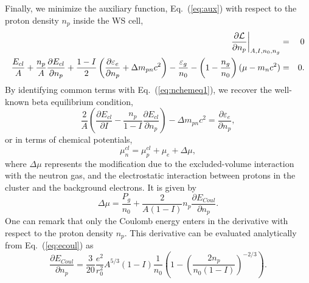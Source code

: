 Finally, we minimize the auxiliary function, Eq.~(\ref{eq:aux}) with respect to
the proton density $n_p$ inside the WS cell,
%
\begin{eqnarray}
  \frac{\partial \mathcal{L}}{\partial n_p}\bigg|_{A,I,n_0,n_g} &=& 0 \notag\\
  \frac{E_{cl}}{A} + \frac{n_p}{A}\frac{\partial E_{cl}}{\partial n_p} +
  \frac{1-I}{2}\left(\frac{\partial \varepsilon_e}{\partial n_p} + \Delta
  m_{pn}c^2\right) - \frac{\varepsilon_g}{n_0} -
  \left(1-\frac{n_g}{n_0}\right)(\mu-m_nc^2) &=& 0. \notag\\
\end{eqnarray}
%
By identifying common terms with Eq.~(\ref{eq:nchemeq1}), we recover the 
well-known beta equilibrium condition,
%
\begin{equation}
  \frac{2}{A}\left(\frac{\partial E_{cl}}{\partial I} -
  \frac{n_p}{1-I}\frac{\partial E_{cl}}{\partial n_p}\right) - \Delta
  m_{pn}c^2 =
  \frac{\partial \varepsilon_e}{\partial n_p},
\end{equation}
%
or in terms of chemical potentials,
%
\begin{equation}
  \mu_n^{cl} = \mu_p^{cl} + \mu_e + \Delta \mu,\label{eq:betaeq}
\end{equation}
%
where $\Delta \mu$ represents the modification due to the excluded-volume
interaction with the neutron gas, and the electrostatic interaction between
protons in the cluster and the background electrons. It is given by
%
\begin{equation}
  \Delta \mu = \frac{P_g}{n_0} + \frac{2}{A(1-I)}n_p\frac{\partial
  E_{Coul}}{\partial n_p}.
\end{equation}
%
One can remark that only the Coulomb energy enters in the derivative with
respect to the proton density $n_p$. This derivative can be evaluated
analytically from Eq.~(\ref{eq:ecoul}) as
%
\begin{equation}
  \frac{\partial E_{Coul}}{\partial n_p} =
  \frac{3}{20}\frac{e^2}{r_0^2}A^{5/3}(1-I)\frac{1}{n_0}
  \left(1-\left(\frac{2n_p}{n_0(1-I)}\right)^{-2/3}\right).
\end{equation}
%

